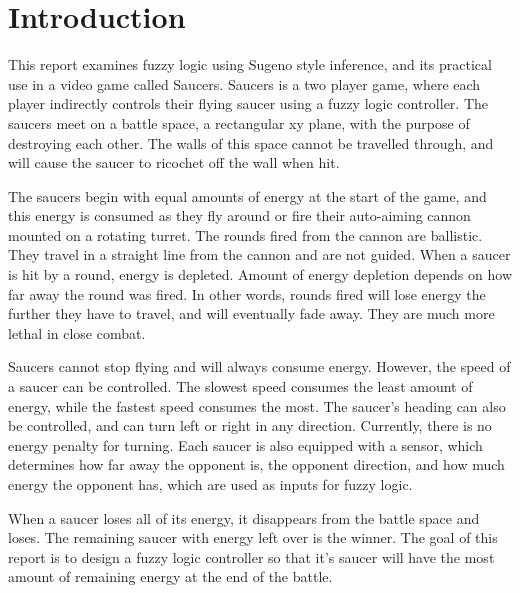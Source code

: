 \section{Introduction}

This report examines fuzzy logic using Sugeno style inference, and its practical use in a video game called Saucers. Saucers is a two player game, where each player indirectly controls their flying saucer using a fuzzy logic controller. The saucers meet on a battle space, a rectangular xy plane, with the purpose of destroying each other. The walls of this space cannot be travelled through, and will cause the saucer to ricochet off the wall when hit.

The saucers begin with equal amounts of energy at the start of the game, and this energy is consumed as they fly around or fire their auto-aiming cannon mounted on a rotating turret. The rounds fired from the cannon are ballistic. They travel in a straight line from the cannon and are not guided. When a saucer is hit by a round, energy is depleted. Amount of energy depletion depends on how far away the round was fired. In other words, rounds fired will lose energy the further they have to travel, and will eventually fade away. They are much more lethal in close combat.

Saucers cannot stop flying and will always consume energy. However, the speed of a saucer can be controlled. The slowest speed consumes the least amount of energy, while the fastest speed consumes the most. The saucer's heading can also be controlled, and can turn left or right in any direction. Currently, there is no energy penalty for turning. Each saucer is also equipped with a sensor, which determines how far away the opponent is, the opponent direction, and how much energy the opponent has, which are used as inputs for fuzzy logic.

When a saucer loses all of its energy, it disappears from the battle space and loses. The remaining saucer with energy left over is the winner. The goal of this report is to design a fuzzy logic controller so that it's saucer will have the most amount of remaining energy at the end of the battle.